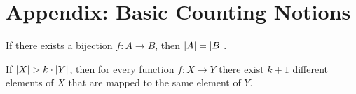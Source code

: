 \documentclass[12pt]{article}
\begin{document}
\begin{enumerate}


\end{enumerate}





\newpage
\section*{Appendix: Basic Counting Notions}

\begin{comment}
A \term{bijection} or \term{bijective function} is a function $f : X
\to Y$ such that every element of the codomain is related to exactly
one element of the domain.  Here is an example of a bijection:

\begin{center}
\unitlength = 2pt
\begin{picture}(50,60)(-10,-5)
\thinlines
\put(-30,30){\makebox(0,0){domain}}
\put(60,30){\makebox(0,0){codomain}}
\put(-5,50){\makebox(0,0){$X$}}
  \put(15,50){\makebox(0,0){$f$}}
  \put(35,50){\makebox(0,0){$Y$}}
\put(-5,40){\makebox(0,0){a}}
  \put(0,40){\vector(3,-1){28}}
  \put(35,40){\makebox(0,0){1}}
\put(-5,30){\makebox(0,0){b}}
  \put(0,30){\vector(3,-1){28}}
  \put(35,30){\makebox(0,0){2}}
\put(-5,20){\makebox(0,0){c}}
  \put(0,20){\vector(3,-1){28}}
  \put(35,20){\makebox(0,0){3}}
\put(-5,10){\makebox(0,0){d}}
  \put(0,10){\vector(1,1){28}}
  \put(35,10){\makebox(0,0){4}}
\put(-5,0){\makebox(0,0){e}}
  \put(0,0){\vector(1,0){28}}
  \put(35,0){\makebox(0,0){5}}
\end{picture}
\end{center}
\end{comment}

\begin{mathrule}
If there exists a bijection $f : A \to B$, then $\left|A\right| = \left|B\right|$.
\end{mathrule}

\begin{mathrule}
If $\left|X\right| > k\cdot \left|Y\right|$, then for every function $f : X \to Y$ there
exist $k+1$ different elements of $X$ that are mapped to the same
element of $Y$.
\end{mathrule}
\end{document}
